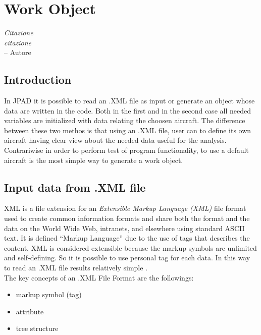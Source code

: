 \chapter{Work Object}%
\label{ch:workobject}

\begin{flushright}
	{\smaller
		\textit{Citazione\\ citazione}\\
		-- Autore}
\end{flushright}

\section {Introduction}
In JPAD it is possible to read an .XML file as input or generate an object whose data are written in the code. Both in the first and in the second case all needed variables are initialized with data relating the choosen aircraft. The difference between these two methos is that using an .XML file, user can to define its own aircraft having clear view about the needed data useful for the analysis.\\
Contrariwise in order to perform test of program functionality, to use a default aircraft is the most simple way to generate a work object.

\section {Input data from .XML file}
XML is a file extension for an {\itshape Extensible Markup Language (XML)} file format used to create common information formats and share both the format and the data on the World Wide Web, intranets, and elsewhere using standard ASCII text.
It is defined ``Markup Language'' due to the use of tags that describes the content. XML is considered extensible because the markup symbols are unlimited and self-defining. So it is possible to use personal tag for each data. In this way to read an .XML file results relatively simple .\\
The key concepts of an .XML File Format are the followings:
\begin{itemize}
\item markup symbol (tag)
\item attribute
\item tree structure
\end{itemize}


